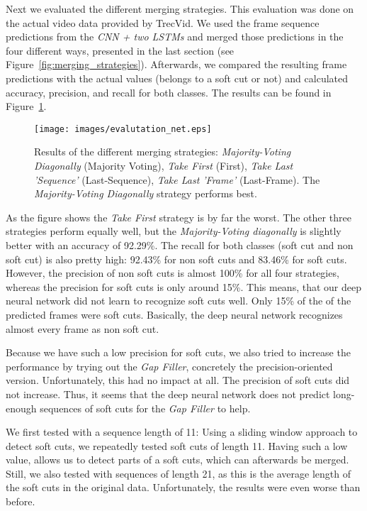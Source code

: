 Next we evaluated the different merging strategies.
This evaluation was done on the actual video data provided by TrecVid.
We used the frame sequence predictions from the \textit{CNN + two LSTMs} and merged those predictions in the four different ways, presented in the last section (see Figure~\ref{fig:merging_strategies}).
Afterwards, we compared the resulting frame predictions with the actual values (belongs to a soft cut or not) and calculated accuracy, precision, and recall for both classes.
The results can be found in Figure~\ref{fig:evaluation_net}.
\begin{figure}[!htb]
	\centering
	\texttt{[image: images/evalutation\_net.eps]}
	\caption{Results of the different merging strategies: \textit{Majority-Voting Diagonally} (Majority Voting), \textit{Take First} (First), \textit{Take Last 'Sequence'} (Last-Sequence), \textit{Take Last 'Frame'} (Last-Frame). The \textit{Majority-Voting Diagonally} strategy performs best.}
	\label{fig:evaluation_net}
\end{figure}
As the figure shows the \textit{Take First} strategy is by far the worst.
The other three strategies perform equally well, but the \textit{Majority-Voting diagonally} is slightly better with an accuracy of 92.29\%.
The recall for both classes (soft cut and non soft cut) is also pretty high: 92.43\% for non soft cuts and 83.46\% for soft cuts.
However, the precision of non soft cuts is almost 100\% for all four strategies, whereas the precision for soft cuts is only around 15\%.
This means, that our deep neural network did not learn to recognize soft cuts well.
Only 15\% of the of the predicted frames were soft cuts.
Basically, the deep neural network recognizes almost every frame as non soft cut.

Because we have such a low precision for soft cuts, we also tried to increase the performance by trying out the \textit{Gap Filler}, concretely the precision-oriented version.
Unfortunately, this had no impact at all.
The precision of soft cuts did not increase.
Thus, it seems that the deep neural network does not predict long-enough sequences of soft cuts for the \textit{Gap Filler} to help.

We first tested with a sequence length of 11:
Using a sliding window approach to detect soft cuts, we repeatedly tested soft cuts of length 11.
Having such a low value, allows us to detect parts of a soft cuts, which can afterwards be merged.
Still, we also tested with sequences of length 21, as this is the average length of the soft cuts in the original data.
Unfortunately, the results were even worse than before.
